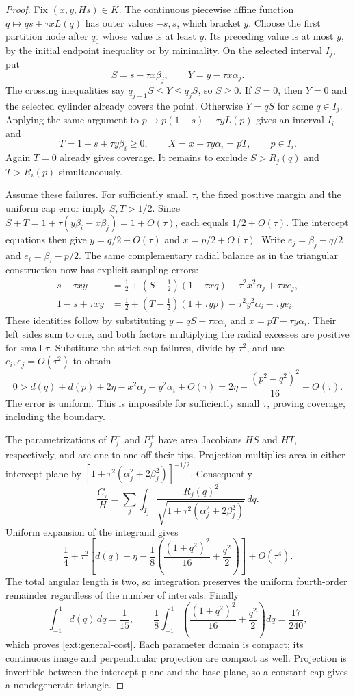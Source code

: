 \begin{proof}
Fix $(x,y,Hs)\in K$.  The continuous piecewise affine function
$q\mapsto qs+\tau xL(q)$ has outer values $-s,s$, which bracket $y$.
Choose the first partition node after $q_0$ whose value is at least $y$.
Its preceding value is at most $y$, by the initial endpoint inequality
or by minimality.  On the selected interval $I_j$, put
\[
 S=s-\tau x\beta_j,\qquad Y=y-\tau x\alpha_j.
\]
The crossing inequalities say $q_{j-1}S\le Y\le q_jS$, so $S\ge0$.
If $S=0$, then $Y=0$ and the selected cylinder already covers the point.
Otherwise $Y=qS$ for some $q\in I_j$.
Applying the same argument to
$p\mapsto p(1-s)-\tau yL(p)$ gives an interval $I_i$ and
\[
 T=1-s+\tau y\beta_i\ge0,\qquad
 X=x+\tau y\alpha_i=pT,\qquad p\in I_i.
\]
Again $T=0$ already gives coverage.  It remains to exclude
$S>R_j(q)$ and $T>R_i(p)$ simultaneously.

Assume these failures.  For sufficiently small $\tau$, the fixed
positive margin and the uniform cap error imply $S,T>1/2$.
Since $S+T=1+\tau(y\beta_i-x\beta_j)=1+O(\tau)$, each equals
$1/2+O(\tau)$.  The intercept equations then give
$y=q/2+O(\tau)$ and $x=p/2+O(\tau)$.
Write $e_j=\beta_j-q/2$ and $e_i=\beta_i-p/2$.
The same complementary radial balance as in the triangular construction
now has explicit sampling errors:
\begin{align*}
 s-\tau xy
 &=\tfrac12+(S-\tfrac12)(1-\tau xq)
       -\tau^2x^2\alpha_j+\tau xe_j,\\
 1-s+\tau xy
 &=\tfrac12+(T-\tfrac12)(1+\tau yp)
       -\tau^2y^2\alpha_i-\tau ye_i.
\end{align*}
These identities follow by substituting
$y=qS+\tau x\alpha_j$ and $x=pT-\tau y\alpha_i$.
Their left sides sum to one, and both factors multiplying the radial
excesses are positive for small $\tau$.  Substitute the strict cap
failures, divide by $\tau^2$, and use $e_i,e_j=O(\tau^2)$ to obtain
\[
 0> d(q)+d(p)+2\eta-x^2\alpha_j-y^2\alpha_i+O(\tau)
   =2\eta+\frac{(p^2-q^2)^2}{16}+O(\tau).
\]
The error is uniform.  This is impossible for sufficiently small
$\tau$, proving coverage, including the boundary.

The parametrizations of $P_j^-$ and $P_j^+$ have area Jacobians $HS$
and $HT$, respectively, and are one-to-one off their tips.
Projection multiplies area in either intercept plane by
$[1+\tau^2(\alpha_j^2+2\beta_j^2)]^{-1/2}$.
Consequently
\[
 \frac{C_\tau}{H}=
 \sum_j\int_{I_j}\frac{R_j(q)^2}
 {\sqrt{1+\tau^2(\alpha_j^2+2\beta_j^2)}}\,dq.
\]
Uniform expansion of the integrand gives
\[
 \frac14+\tau^2\left[
 d(q)+\eta-\frac18\left(\frac{(1+q^2)^2}{16}+\frac{q^2}{2}\right)
 \right]+O(\tau^4).
\]
The total angular length is two, so integration preserves the uniform
fourth-order remainder regardless of the number of intervals.  Finally
\[
 \int_{-1}^1d(q)\,dq=\frac1{15},\qquad
 \frac18\int_{-1}^1\left(\frac{(1+q^2)^2}{16}+\frac{q^2}{2}\right)dq
 =\frac{17}{240},
\]
which proves \eqref{ext:general-cost}.  Each parameter domain is compact;
its continuous image and perpendicular projection are compact as well.
Projection is invertible between the intercept plane and the base plane,
so a constant cap gives a nondegenerate triangle.
\end{proof}

